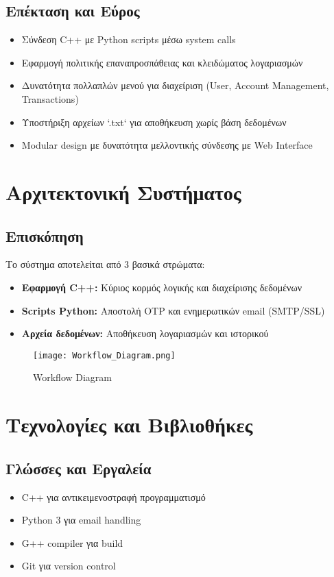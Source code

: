 \documentclass[a4paper,12pt]{article}
\begin{document}
\subsection*{Επέκταση και Εύρος}
\begin{itemize}[label=\textbullet]
    \item Σύνδεση C++ με Python scripts μέσω system calls
    \item Εφαρμογή πολιτικής επαναπροσπάθειας και κλειδώματος λογαριασμών
    \item Δυνατότητα πολλαπλών μενού για διαχείριση (User, Account Management, Transactions)
    \item Υποστήριξη αρχείων `.txt` για αποθήκευση χωρίς βάση δεδομένων
    \item Modular design με δυνατότητα μελλοντικής σύνδεσης με Web Interface
\end{itemize}

\section{Αρχιτεκτονική Συστήματος}
\subsection*{Επισκόπηση}
Το σύστημα αποτελείται από 3 βασικά στρώματα:
\begin{itemize}[label=\textbullet]
    \item \textbf{Εφαρμογή C++:} Κύριος κορμός λογικής και διαχείρισης δεδομένων
    \item \textbf{Scripts Python:} Αποστολή OTP και ενημερωτικών email (SMTP/SSL)
    \item \textbf{Αρχεία δεδομένων:} Αποθήκευση λογαριασμών και ιστορικού
\end{itemize}

\newpage
\thispagestyle{empty}
\begin{figure}
    \centering
    \texttt{[image: Workflow\_Diagram.png]}
    \caption{Workflow Diagram}
\end{figure}
\restoregeometry
\newpage

\section{Τεχνολογίες και Βιβλιοθήκες}
\subsection*{Γλώσσες και Εργαλεία}
\begin{itemize}[label=\textbullet]
    \item C++ για αντικειμενοστραφή προγραμματισμό
    \item Python 3 για email handling
    \item G++ compiler για build
    \item Git για version control
\end{itemize}
\end{document}
